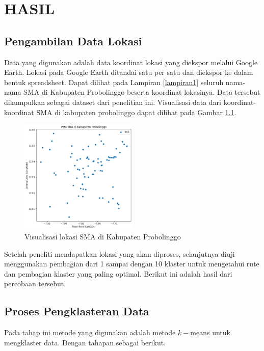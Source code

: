 \chapter{HASIL}

\section{Pengambilan Data Lokasi}

Data yang digunakan adalah data koordinat lokasi yang diekspor melalui Google Earth. Lokasi pada Google Earth ditandai satu per satu dan diekspor ke dalam bentuk spreadsheet. Dapat dilihat pada Lampiran \ref{lampiran1} seluruh nama-nama SMA di Kabupaten Probolinggo beserta koordinat lokasinya. Data tersebut dikumpulkan sebagai dataset dari penelitian ini. Visualisasi data dari koordinat-koordinat SMA di kabupaten probolinggo dapat dilihat pada Gambar \ref{fig:petasma}.

\begin{figure}[H]
  \centering
  \includegraphics[width=0.5\textwidth]{Gambar/peta sma.png}
  \caption{Visualisasi lokasi SMA di Kabupaten Probolinggo}
  \label{fig:petasma}
\end{figure}

Setelah peneliti mendapatkan lokasi yang akan diproses, selanjutnya diuji menggunakan pembagian dari 1 sampai dengan 10 klaster untuk mengetahui rute dan pembagian klaster yang paling optimal. Berikut ini adalah hasil dari percobaan tersebut.

\section{Proses Pengklasteran Data}

Pada tahap ini metode yang digunakan adalah metode $k-$means untuk mengklaster data. Dengan tahapan sebagai berikut.

